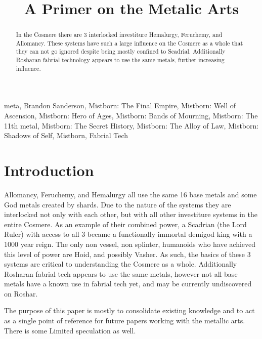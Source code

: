 \documentclass[conference]{IEEEtran}
\begin{document}
\title{A Primer on the Metalic Arts}

\author{
}

\maketitle

\begin{abstract}
In the Cosmere there are 3 interlocked investiture Hemalurgy, Feruchemy, and Allomancy.  These systems have such a large influence on the Cosmere as a whole that they can not go ignored despite being mostly confined to Scadrial.  Additionally Rosharan fabrial technology appears to use the same metals, further increasing influence.
\end{abstract}

\begin{IEEEkeywords}
meta, Brandon Sanderson, Mistborn: The Final Empire, Mistborn: Well of Ascension, Mistborn: Hero of Ages, Mistborn: Bands of Mourning, Mistborn: The 11th metal, Mistborn: The Secret History, Mistborn: The Alloy of Law, Mistborn: Shadows of Self, Mistborn, Fabrial Tech
\end{IEEEkeywords}

\section*{Introduction}
Allomancy, Feruchemy, and Hemalurgy all use the same 16 base metals and some God metals created by shards\cite{ARS}. Due to the nature of the systems they are interlocked not only with each other, but with all other investiture systems in the entire Cosmere.  As an example of their combined power, a Scadrian (the Lord Ruler) with access to all 3 became a functionally immortal demigod king with a 1000 year reign\cite{TFE}.  The only non vessel, non splinter, humanoids who have achieved this level of power are Hoid, and possibly Vasher.  As such, the basics of these 3 systems are critical to understanding the Cosmere as a whole.  Additionally Rosharan fabrial tech appears to use the same metals\cite{RoW-CHh46}, however not all base metals have a known use in fabrial tech yet, and may be currently undiscovered on Roshar. 

The purpose of this paper is mostly to consolidate existing knowledge and to act as a single point of reference for future papers working with the metallic arts.  There is some Limited speculation as well.
\end{document}

